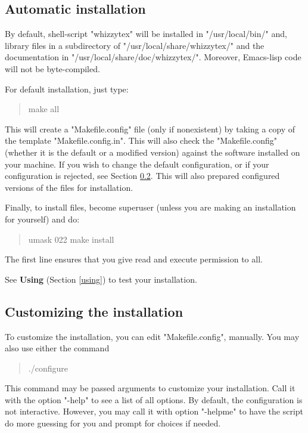 \documentclass[12pt]{article}
\begin{document}
\subsection {Automatic installation}

\label {install/automatic}

By default, shell-script \lst"whizzytex" will be installed in 
\lst"/usr/local/bin/" and, library files in
a subdirectory of \lst"/usr/local/share/whizzytex/" and the documentation in
\lst"/usr/local/share/doc/whizzytex/".  Moreover, Emacs-lisp code will not
be byte-compiled.

For default installation, just type: 
\begin{quote}
\begin{tt}
make all
\end{tt}
\end{quote}
This will create a \lst"Makefile.config" file (only if nonexistent) by
taking a copy of the template \lst"Makefile.config.in". This will also check
the \lst"Makefile.config" (whether it is the default or a modified version)
against the software installed on your machine.  If you wish to change the
default configuration, or if your configuration is rejected, see Section
\ref {customizing}. This will also prepared configured
versions of the files for installation.

Finally, to install files, become superuser (unless you are making 
an installation for yourself) and do:
\begin{quote}
\begin{tt}
umask 022
make install
\end{tt}
\end{quote}
The first line ensures that you give read and execute permission to all.

See {\bf Using {\whizzy}} (Section \ref {using}) to test your
installation.

\subsection {Customizing the installation}
\label {customizing}

To customize the installation, you can edit 
\lst"Makefile.config", manually.
You may also use either the command
\begin{quote}
\begin{tt}
./configure
\end{tt}
\end{quote}
This command may be passed arguments to customize your installation.
Call it with the option \lst"-help" to see a list of all options.
%
By default, the configuration is not interactive.  However, you may call it
with option \lst"-helpme" to have the script do more guessing for you and
prompt for choices if needed.
\end{document}
